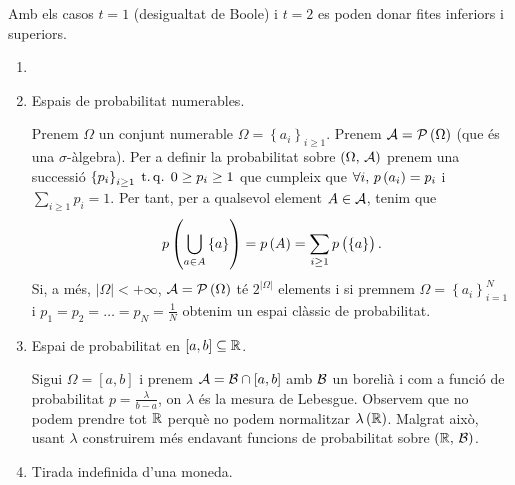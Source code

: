 \begin{obs}
    Amb els casos $t=1$ (desigualtat de Boole) i $t=2$ es poden donar fites inferiors i superiors.
\end{obs}

\begin{example}
    \begin{enumerate}
     \item []
     \item Espais de probabilitat numerables.
     
     Prenem $\Omega$ un conjunt numerable $\Omega =\left\{a_i\right\}_{i\geq 1}$. Prenem $\mathcal{A} = \mathcal{P}\left( \Omega\right)$
     (que és una $\sigma$-àlgebra). Per a definir la probabilitat sobre $\left(\Omega,\,\mathcal{A}\right)$ prenem una successió 
     $\left\{p_i\right\}_{i\geq 1} \operatorname{\;t.q.\;} 0\geq p_i\geq 1$ que cumpleix que $\forall i,\, p\left( a_i\right) = p_i$ i 
     $\sum\limits_{i\geq1}p_i=1$. Per tant, per a qualsevol element $A\in\mathcal{A}$, tenim que
     \[
	p\left(\bigcup\limits_{a\in A} \left\{a\right\}\right) = p\left( A\right) = \sum\limits_{i\geq 1} p\left( \left\{a\right\}\right).
     \]
     Si, a més, $|\Omega|<+\infty$, $\mathcal{A} = \mathcal{P}\left(\Omega\right)$ té $2^{|\Omega|}$ elements i si premnem 
     $\Omega =\left\{a_i\right\}_{i=1}^{N}$ i $p_1=p_2=\dots=p_N = \frac{1}{N}$ obtenim un espai clàssic de probabilitat.
     
     \item Espai de probabilitat en $\left[a,b\right]\subseteq \mathbb{R}$.
     
      Sigui $\Omega=\left[a,b\right]$ i prenem $\mathcal{A}=\mathcal{B}\cap\left[a,b\right]$ amb $\mathcal{B}$ un borelià i com a funció de probabilitat $p=\frac{\lambda}{b-a}$, on $\lambda$
      és la mesura de Lebesgue. Observem que no podem prendre tot $\mathbb{R}$ perquè no podem normalitzar $\lambda\left(\mathbb{R}\right)$. Malgrat això, usant $\lambda$ construirem
      més endavant funcions de probabilitat sobre $\left(\mathbb{R},\,\mathcal{B}\right)$.
      
     \item Tirada indefinida d'una moneda.
     

\end{enumerate}
\end{example}
